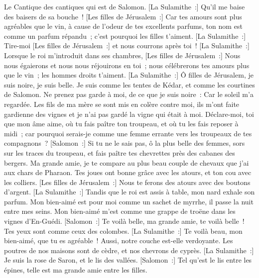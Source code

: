 \begin{multicols}{2}
\VerseOne{}Le Cantique des cantiques qui est de Salomon.
[La Sulamithe~:] Qu'il me baise des baisers de sa bouche~! [Les filles de Jérusalem~:] Car tes amours sont plus agréables que le vin,
à cause de l'odeur de tes excellents parfums, ton nom est comme un parfum répandu~; c'est pourquoi les filles t'aiment.
[La Sulamithe~:] Tire-moi [Les filles de Jérusalem~:] et nous courrons après toi~! [La Sulamithe~:] Lorsque le roi m'introduit dans ses chambres, [Les filles de Jérusalem~:] Nous nous égaierons et nous nous réjouirons en toi~; nous célébrerons tes amours plus que le vin~; les hommes droits t'aiment.
[La Sulamithe~:] Ô filles de Jérusalem, je suis noire, je suis belle. Je suis comme les tentes de Kédar, et comme les courtines de Salomon.
Ne prenez pas garde à moi, de ce que je suis noire~: Car le soleil m'a regardée. Les fils de ma mère se sont mis en colère contre moi, ils m'ont faite gardienne des vignes et je n'ai pas gardé la vigne qui était à moi.
Déclare-moi, toi que mon âme aime, où tu fais paître ton troupeau, et où tu les fais reposer à midi~; car pourquoi serais-je comme une femme errante vers les troupeaux de tes compagnons~?
[Salomon~:] Si tu ne le sais pas, ô la plus belle des femmes, sors sur les traces du troupeau, et fais paître tes chevrettes près des cabanes des bergers.
Ma grande amie, je te compare au plus beau couple de chevaux que j'ai aux chars de Pharaon.
Tes joues ont bonne grâce avec les atours, et ton cou avec les colliers.
[Les filles de Jérusalem~:] Nous te ferons des atours avec des boutons d'argent.
[La Sulamithe~:] Tandis que le roi est assis à table, mon nard exhale son parfum.
Mon bien-aimé est pour moi comme un sachet de myrrhe, il passe la nuit entre mes seins.
Mon bien-aimé m'est comme une grappe de troëne dans les vignes d'En-Guédi.
[Salomon~:] Te voilà belle, ma grande amie, te voilà belle~! Tes yeux sont comme ceux des colombes.
[La Sulamithe~:] Te voilà beau, mon bien-aimé, que tu es agréable~! Aussi, notre couche est-elle verdoyante.
Les poutres de nos maisons sont de cèdre, et nos chevrons de cyprès.
\VerseOne{}[La Sulamithe~:] Je suis la rose de Saron, et le lis des vallées.
[Salomon~:] Tel qu'est le lis entre les épines, telle est ma grande amie entre les filles.

\end{multicols}
